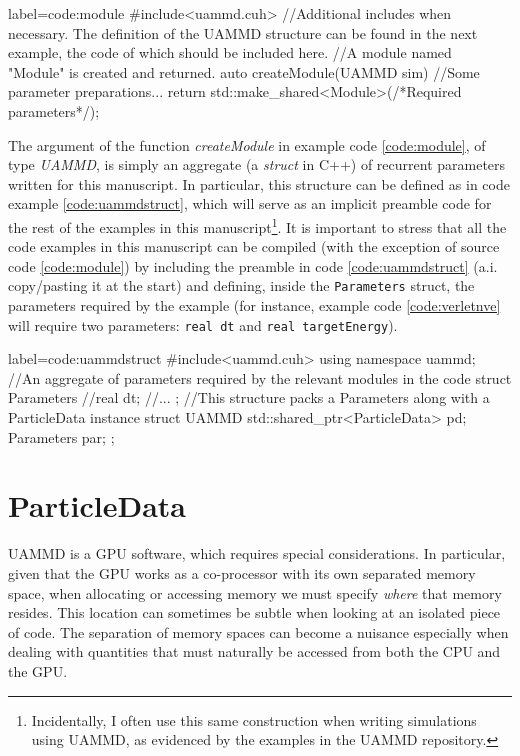 \documentclass[ twoside,openright,titlepage,numbers=noenddot,%
headinclude,footinclude,cleardoublepage=empty,abstract=on,
BCOR=5mm,paper=b5,fontsize=11pt, dvipsnames
]{scrreprt}
\def\ucpp{uammd_cpp_lexer.py:UAMMDCppLexer -x}
\newcommand{\uammd}{\gls{UAMMD}\xspace}
\newcommand{\gpu}{\gls{GPU}\xspace}
\begin{document}
\begin{code2}{label=code:module}
#include<uammd.cuh>
//Additional includes when necessary. The definition of the UAMMD structure can be found in the next example, the code of which should be included here.
//A module named "Module" is created and returned.
auto createModule(UAMMD sim){
  //Some parameter preparations...
  return std::make_shared<Module>(/*Required parameters*/);
}
\end{code2}

The argument of the function \emph{createModule} in example code \ref{code:module}, of type \emph{UAMMD}, is simply an aggregate (a \emph{struct} in C++) of recurrent parameters written for this manuscript. In particular, this structure can be defined as in code example \ref{code:uammdstruct}, which will serve as an implicit preamble code for the rest of the examples in this manuscript\footnote{Incidentally, I often use this same construction when writing simulations using \uammd, as evidenced by the examples in the UAMMD repository.}. It is important to stress that all the code examples in this manuscript can be compiled (with the exception of source code \ref{code:module}) by including the preamble in code \ref{code:uammdstruct} (a.i. copy/pasting it at the start) and defining, inside the \texttt{Parameters} struct, the parameters required by the example (for instance, example code \ref{code:verletnve} will require two parameters: \texttt{real dt} and \texttt{real targetEnergy}).

\begin{code2}
  {label=code:uammdstruct}
#include<uammd.cuh>
using namespace uammd; 
//An aggregate of parameters required by the relevant modules in the code
struct Parameters{
  //real dt;
  //...
};
//This structure packs a Parameters along with a ParticleData instance
struct UAMMD{
  std::shared_ptr<ParticleData> pd;
  Parameters par;
};
\end{code2}

\chapter{ParticleData}\label{sec:particledata}
\uammd is a \gpu software, which requires special considerations. In particular, given that the \gpu works as a co-processor with its own separated memory space, when allocating or accessing memory we must specify \emph{where} that memory resides. This location can sometimes be subtle when looking at an isolated piece of code. The separation of memory spaces can become a nuisance especially when dealing with quantities that must naturally be accessed from both the CPU and the \gpu.
\end{document}
